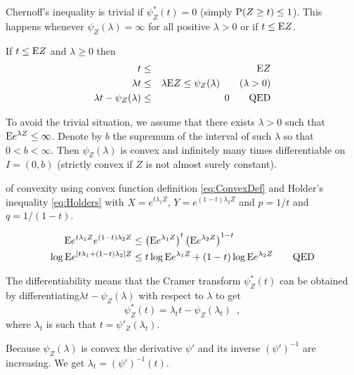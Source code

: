 Chernoff's inequality is trivial if $\psi_Z^*(t) = 0$ (simply $\mathrm{P}(Z \geq t) \leq 1$). This happens whenever $\psi_Z(\lambda) = \infty$ for all positive $\lambda > 0$ or if $t \leq \mathrm{E}{Z}$.

\begin{prf}
If $t \leq \mathrm{E}{Z}$ and $\lambda \geq 0$ then
\begin{eqnarray*}
t &\leq& \mathrm{E}{Z} \nonumber \\
\lambda t &\leq& \lambda \mathrm{E}{Z} \leq \psi_Z(\lambda) \qquad (\lambda > 0) \nonumber \\
\lambda t - \psi_Z(\lambda) &\leq& 0 \qquad \text{QED}
\end{eqnarray*}
\end{prf}

To avoid the trivial situation, we assume that there exists $\lambda > 0$ such that $\mathrm{E} e^{\lambda Z} \leq \infty$.
Denote by $b$ the supremum of the interval of such $\lambda$ so that $0 < b < \infty$.
Then $\psi_Z(\lambda)$ is convex and infinitely many times differentiable on $I=(0,b)$ (strictly convex if $Z$ is not almost surely constant).

\begin{prf} of convexity using convex function definition \eqref{eq:ConvexDef} and Holder's inequality \eqref{eq:Holders} with $X = e^{t\lambda_1 Z}$, $Y = e^{(1-t)\lambda_2 Z}$ and $p = 1/t$ and $q = 1/(1-t)$.

\begin{align*}
\mathrm{E} e^{t\lambda_1 Z} e^{(1-t)\lambda_2 Z} & \leq \left(\mathrm{E} e^{\lambda_1 Z}\right)^t \left(\mathrm{E} e^{\lambda_2 Z}\right)^{1-t} \\
\log \mathrm{E} e^{[t\lambda_1 + (1-t)\lambda_2] Z} & \leq t \log \mathrm{E} e^{\lambda_1 Z} + (1-t) \log \mathrm{E} e^{\lambda_2 Z} \qquad \text{QED}
\end{align*}
\end{prf}

The differentiability means that the Cramer transform $\psi_Z^*(t)$ can be obtained by differentiating$ \lambda t - \psi_Z(\lambda)$ with respect to $\lambda$ to get
\begin{equation}
\psi_Z^*(t) = \lambda_t t - \psi_Z(\lambda_t) \enspace ,
\end{equation}
where $\lambda_t$ is such that $t = \psi'_Z(\lambda_t)$.

Because $\psi_Z(\lambda)$ is convex the derivative $\psi'$ and its inverse $(\psi')^{-1}$ are increasing.
We get $\lambda_t = (\psi')^{-1}(t)$.

